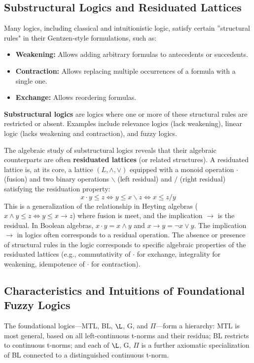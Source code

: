 \subsection{Substructural Logics and Residuated Lattices}

Many logics, including classical and intuitionistic logic, satisfy certain ''structural rules" in their Gentzen-style formulations, such as:
\begin{itemize}
    \item \textbf{Weakening:} Allows adding arbitrary formulas to antecedents or succedents.
    \item \textbf{Contraction:} Allows replacing multiple occurrences of a formula with a single one.
    \item \textbf{Exchange:} Allows reordering formulas.
\end{itemize}
\textbf{Substructural logics} are logics where one or more of these structural rules are restricted or absent. Examples include relevance logics (lack weakening), linear logic (lacks weakening and contraction), and fuzzy logics.

The algebraic study of substructural logics reveals that their algebraic counterparts are often \textbf{residuated lattices} (or related structures).
A residuated lattice is, at its core, a lattice $(L, \land, \lor)$ equipped with a monoid operation $\cdot$ (fusion) and two binary operations $\backslash$ (left residual) and $/$ (right residual) satisfying the residuation property:
\[ x \cdot y \le z \iff y \le x \backslash z \iff x \le z / y \]
This is a generalization of the relationship in Heyting algebras ($x \land y \le z \iff y \le x \to z$) where fusion is meet, and the implication $\to$ is the residual. In Boolean algebras, $x \cdot y = x \land y$ and $x \to y = \neg x \lor y$. The implication $\to$ in logics often corresponds to a residual operation.
The absence or presence of structural rules in the logic corresponds to specific algebraic properties of the residuated lattices (e.g., commutativity of $\cdot$ for exchange, integrality for weakening, idempotence of $\cdot$ for contraction).



\subsection{Characteristics and Intuitions of Foundational Fuzzy Logics}

The foundational logics—MTL, BL, $\L$, G, and $\Pi$—form a hierarchy: MTL is most general, based on all left-continuous t-norms and their residua; BL restricts to continuous t-norms; and each of $\L$, G, $\Pi$ is a further axiomatic specialization of BL connected to a distinguished continuous t-norm.

